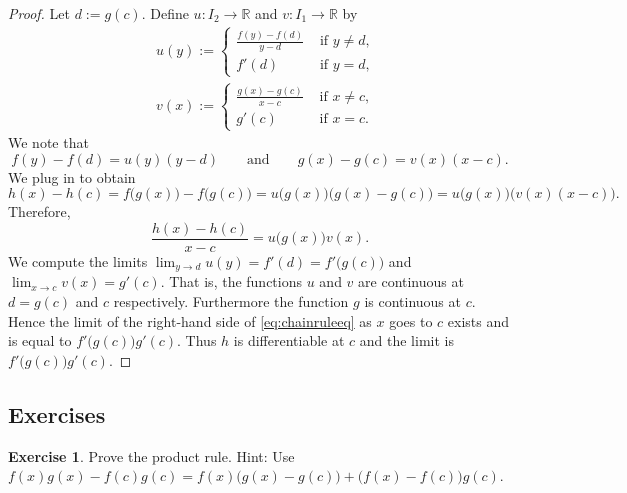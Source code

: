 \documentclass[12pt]{book}
\newcommand{\R}{{\mathbb{R}}}
\theoremstyle{plain}
\theoremstyle{remark}
\theoremstyle{definition}
\theoremstyle{exercise}
\newtheorem{exercise}{Exercise}[section]
\theoremstyle{example}
\begin{document}
\begin{proof}
Let $d := g(c)$.  Define
$u \colon I_2 \to \R$ and $v \colon I_1 \to \R$ by
\begin{align*}
& u(y) :=
\begin{cases}
 \frac{f(y) - f(d)}{y-d}  & \text{ if $y \not=d$,} \\
f'(d) & \text{ if $y = d$,}
\end{cases}
\\
& v(x) :=
\begin{cases}
\frac{g(x) - g(c)}{x-c} & \text{ if $x \not=c$,} \\
g'(c) & \text{ if $x = c$.}
\end{cases}
\end{align*}
We note that
\begin{equation*}
f(y)-f(d) = u(y) (y-d)
\qquad \text{and} \qquad
g(x)-g(c) = v(x) (x-c) .
\end{equation*}
We plug in to obtain
\begin{equation*}
h(x)-h(c)
=
f\bigl(g(x)\bigr)-f\bigl(g(c)\bigr)
=
u\bigl( g(x) \bigr) \bigl(g(x)-g(c)\bigr)
=
u\bigl( g(x) \bigr) \bigl(v(x) (x-c)\bigr) .
\end{equation*}
Therefore,
\begin{equation} \label{eq:chainruleeq}
\frac{h(x)-h(c)}{x-c}
=
u\bigl( g(x) \bigr) v(x) .
\end{equation}
We compute the limits $\lim_{y \to d} u(y)
= f'(d) = f'\bigl(g(c)\bigr)$ and
$\lim_{x \to c} v(x) = g'(c)$.
That is, the functions $u$ and $v$
are continuous at $d = g(c)$ and $c$ respectively.
Furthermore the function $g$ is continuous at $c$.
Hence the limit of
the right-hand side of \eqref{eq:chainruleeq}
as $x$ goes to $c$
exists and is equal to $f'\bigl(g(c)\bigr) g'(c)$.  Thus $h$
is differentiable at $c$ and the limit is $f'\bigl(g(c)\bigr)g'(c)$.
\end{proof}

\subsection{Exercises}

\begin{exercise}
Prove the product rule.
Hint: Use
$f(x) g(x) - f(c) g(c) = f(x)\bigl( g(x) - g(c) \bigr) + \bigl( f(x) -
f(c) \bigr) g(c)$.
\end{exercise}
\end{document}
